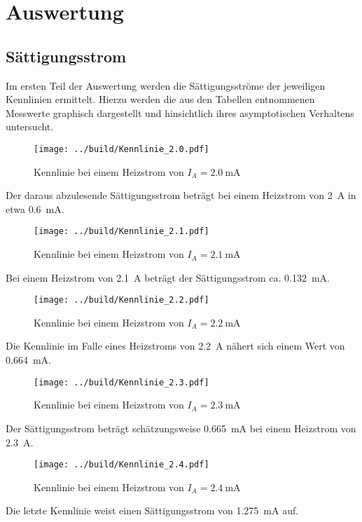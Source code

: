 



\section{Auswertung}
\label{sec:Auswertung}

\subsection{Sättigungsstrom}
\label{sec:Saettigungsstrom}

Im ersten Teil der Auswertung werden die Sättigungsströme der jeweiligen Kennlinien ermittelt. Hierzu werden die aus den Tabellen entnommenen Messwerte
graphisch dargestellt und hinsichtlich ihres asymptotischen Verhaltens untersucht.

\begin{figure}[H]
    \centering
    \texttt{[image: ../build/Kennlinie\_2.0.pdf]}
    \caption{Kennlinie bei einem Heizstrom von $I_A = \qty{2.0}{\milli\ampere}$}
    \label{fig:Kennlinie1}
\end{figure}

\noindent Der daraus abzulesende Sättigungsstrom beträgt bei einem Heizstrom von \qty{2}{\ampere} in etwa \qty{0.6}{\milli\ampere}.

\begin{figure}[H]
    \centering
    \texttt{[image: ../build/Kennlinie\_2.1.pdf]}
    \caption{Kennlinie bei einem Heizstrom von $I_A = \qty{2.1}{\milli\ampere}$}
    \label{fig:Kennlinie2}
\end{figure}

\noindent Bei einem Heizstrom von \qty{2.1}{\ampere} beträgt der Sättigungsstrom ca. \qty{0.132}{\milli\ampere}.

\begin{figure}[H]
    \centering
    \texttt{[image: ../build/Kennlinie\_2.2.pdf]}
    \caption{Kennlinie bei einem Heizstrom von $I_A = \qty{2.2}{\milli\ampere}$}
    \label{fig:Kennlinie3}
\end{figure}

\noindent Die Kennlinie im Falle eines Heizstroms von \qty{2.2}{\ampere} nähert sich einem Wert von \qty{0.664}{\milli\ampere}.

\begin{figure}[H]
    \centering
    \texttt{[image: ../build/Kennlinie\_2.3.pdf]}
    \caption{Kennlinie bei einem Heizstrom von $I_A = \qty{2.3}{\milli\ampere}$}
    \label{fig:Kennlinie4}
\end{figure}

\noindent Der Sättigungsstrom beträgt schätzungsweise \qty{0.665}{\milli\ampere} bei einem Heizstrom von \qty{2.3}{\ampere}.
\begin{figure}[H]
    \centering
    \texttt{[image: ../build/Kennlinie\_2.4.pdf]}
    \caption{Kennlinie bei einem Heizstrom von $I_A = \qty{2.4}{\milli\ampere}$}
    \label{fig:Kennlinie5}
\end{figure}

\noindent Die letzte Kennlinie weist einen Sättigungsstrom von \qty{1.275}{\milli\ampere} auf.


